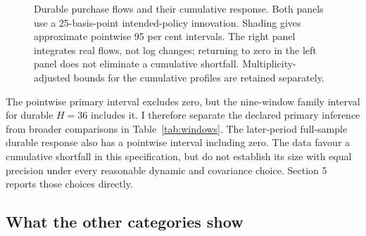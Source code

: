 \documentclass[11pt,a4paper]{article}
\begin{document}
\begin{figure}[htbp]
\caption{Durable purchase flows and their cumulative response. Both panels use a 25-basis-point intended-policy innovation. Shading gives approximate pointwise 95 per cent intervals. The right panel integrates real flows, not log changes; returning to zero in the left panel does not eliminate a cumulative shortfall. Multiplicity-adjusted bounds for the cumulative profiles are retained separately.}
\label{fig:durables}
\end{figure}

The pointwise primary interval excludes zero, but the nine-window family interval for durable $H=36$ includes it. I therefore separate the declared primary inference from broader comparisons in Table~\ref{tab:windows}. The later-period full-sample durable response also has a pointwise interval including zero. The data favour a cumulative shortfall in this specification, but do not establish its size with equal precision under every reasonable dynamic and covariance choice. Section 5 reports those choices directly.

\subsection{What the other categories show}
\end{document}
